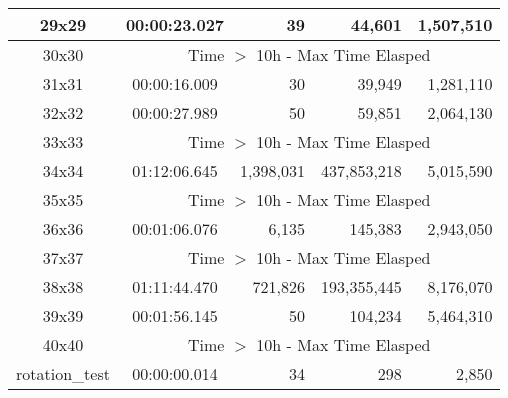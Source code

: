 \begin{center}
\begin{tabular}{|c|c|r|r|r|}
		29x29 & 00:00:23.027 & 39 & 44,601 & 1,507,510 \\ \hline
		30x30 & \multicolumn{4}{|c|}{Time $>$ 10h - Max Time Elasped} \\ \hline
		31x31 & 00:00:16.009 & 30 & 39,949 & 1,281,110 \\ \hline
		32x32 & 00:00:27.989 & 50 & 59,851 & 2,064,130 \\ \hline
		33x33 & \multicolumn{4}{|c|}{Time $>$ 10h - Max Time Elasped} \\ \hline
		34x34 & 01:12:06.645 & 1,398,031 & 437,853,218 & 5,015,590 \\ \hline
		35x35 & \multicolumn{4}{|c|}{Time $>$ 10h - Max Time Elasped} \\ \hline
		36x36 & 00:01:06.076 & 6,135 & 145,383 & 2,943,050 \\ \hline
		37x37 & \multicolumn{4}{|c|}{Time $>$ 10h - Max Time Elasped} \\ \hline
		38x38 & 01:11:44.470 & 721,826 & 193,355,445 & 8,176,070 \\ \hline
		39x39 & 00:01:56.145 & 50 & 104,234 & 5,464,310 \\ \hline
		40x40 & \multicolumn{4}{|c|}{Time $>$ 10h - Max Time Elasped} \\ \hline
		rotation\_test & 00:00:00.014 & 34 & 298 & 2,850 \\ \hline

    \end{tabular}
\end{center}
